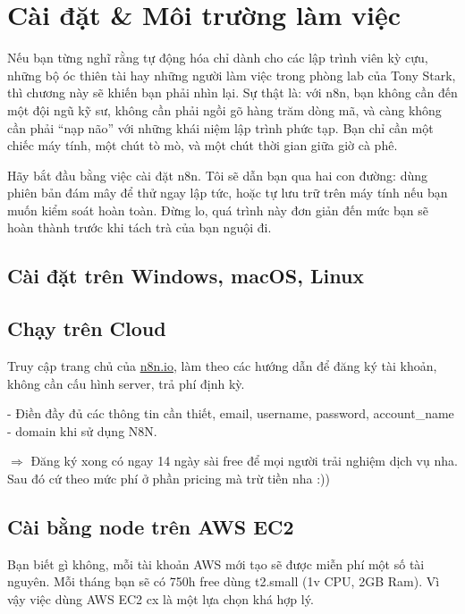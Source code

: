 \chapter{Cài đặt \& Môi trường làm việc}


Nếu bạn từng nghĩ rằng tự động hóa chỉ dành cho các lập trình viên kỳ cựu, những bộ óc thiên tài hay những người làm việc trong phòng lab của Tony Stark, thì chương này sẽ khiến bạn phải nhìn lại. Sự thật là: với n8n, bạn không cần đến một đội ngũ kỹ sư, không cần phải ngồi gõ hàng trăm dòng mã, và càng không cần phải “nạp não” với những khái niệm lập trình phức tạp. Bạn chỉ cần một chiếc máy tính, một chút tò mò, và một chút thời gian giữa giờ cà phê.

Hãy bắt đầu bằng việc cài đặt n8n. Tôi sẽ dẫn bạn qua hai con đường: dùng phiên bản đám mây để thử ngay lập tức, hoặc tự lưu trữ trên máy tính nếu bạn muốn kiểm soát hoàn toàn. Đừng lo, quá trình này đơn giản đến mức bạn sẽ hoàn thành trước khi tách trà của bạn nguội đi.


\section{Cài đặt trên Windows, macOS, Linux}

\section{Chạy trên Cloud}
Truy cập trang chủ của \href{n8n.io}{n8n.io}, làm theo các hướng dẫn để đăng ký tài khoản, không cần cấu hình server, trả phí định kỳ.

- Điền đầy đủ các thông tin cần thiết, email, username, password, account\_name - domain khi sử dụng N8N. 

$\Rightarrow$ Đăng ký xong có ngay 14 ngày sài free để mọi người trải nghiệm dịch vụ nha. Sau đó cứ theo mức phí ở phần pricing mà trừ tiền nha :))

\section{Cài bằng node trên AWS EC2}

Bạn biết gì không, mỗi tài khoản AWS mới tạo sẽ được miễn phí một số tài nguyên. Mỗi tháng bạn sẽ có 750h free dùng t2.small (1v CPU, 2GB Ram). Vì vậy việc dùng AWS EC2 cx là một lựa chọn khá hợp lý.

